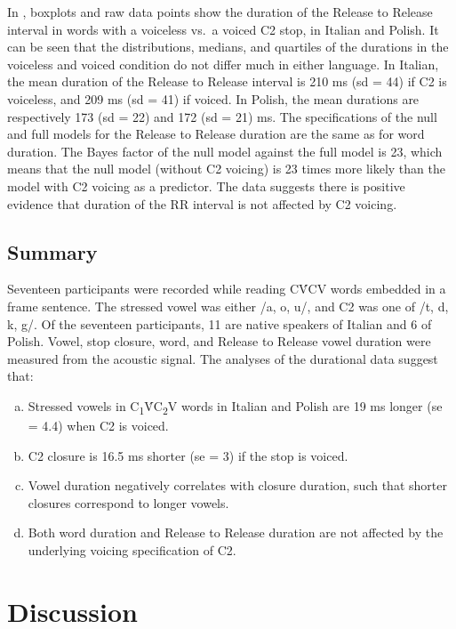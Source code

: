 \documentclass[preprint]{JASAnew}
\begin{document}
In , boxplots and raw data points show the duration of
the Release to Release interval in words with a voiceless vs.~a voiced
C2 stop, in Italian and Polish. It can be seen that the distributions,
medians, and quartiles of the durations in the voiceless and voiced
condition do not differ much in either language. In Italian, the mean
duration of the Release to Release interval is 210 ms (sd = 44) if C2 is
voiceless, and 209 ms (sd = 41) if voiced. In Polish, the mean durations
are respectively 173 (sd = 22) and 172 (sd = 21) ms. The specifications
of the null and full models for the Release to Release duration are the
same as for word duration. The Bayes factor of the null model against
the full model is 23, which means that the null model (without C2
voicing) is 23 times more likely than the model with C2 voicing as a
predictor. The data suggests there is positive evidence that duration of
the RR interval is not affected by C2 voicing.

\hypertarget{summary}{%
\subsection{Summary}\label{summary}}

Seventeen participants were recorded while reading CV́CV words embedded
in a frame sentence. The stressed vowel was either /a, o, u/, and C2 was
one of /t, d, k, g/. Of the seventeen participants, 11 are native
speakers of Italian and 6 of Polish. Vowel, stop closure, word, and
Release to Release vowel duration were measured from the acoustic
signal. The analyses of the durational data suggest that:

\begin{enumerate}[(a)]
  \item Stressed vowels in C\textsubscript{1}V́C\textsubscript{2}V words in Italian and Polish are 19 ms longer (se = 4.4) when C2 is voiced.
  \item C2 closure is 16.5 ms shorter (se = 3) if the stop is voiced.
  \item Vowel duration negatively correlates with closure duration, such that shorter closures correspond to longer vowels.
  \item Both word duration and Release to Release duration are not affected by the underlying voicing specification of C2.
\end{enumerate}

\hypertarget{discussion}{%
\section{Discussion}\label{discussion}}
\end{document}

